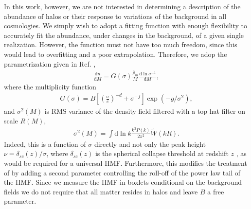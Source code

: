 In this work, however, we are not interested in determining a description of the abundance of halos or their response to variations of the background in all cosmologies. We simply wish to adopt a fitting function with enough flexibility to accurately fit the abundance, under changes in the background, of a given single realization. However, the function must not have too much freedom, since this would lead to overfitting and a poor extrapolation. Therefore, we adop the parametrization given in Ref. \citep{aemulushmf},
\begin{align}
\frac{\mathrm{d}n}{\mathrm{d}M} = G(\sigma)\frac{\overline{\rho}_m}{M}\frac{\mathrm{d}\ln{\sigma^{-1}}}{\mathrm{d}M},
\end{align}
where the multiplicity function
\begin{align}
G(\sigma) = B \left[ \left( \frac{\sigma}{e}\right)^{-d} + \sigma^{-f} \right] \exp{\left( -g / \sigma^2 \right)},
\end{align}
and $\sigma^2(M)$ is RMS variance of the density field filtered with a top hat filter on scale $R(M)$,
\begin{align}
\sigma^2(M) = \int \mathrm{d}\ln{k} \frac{k^3 P(k)}{2\pi^2} \tilde{W}(kR).
\end{align}
Indeed, this is a function of $\sigma$ directly and not only the peak height $\nu = \delta_{sc}(z)/\sigma$, where $\delta_{sc}(z)$ is the spherical collapse threshold at redshift $z$ \citep{halomodelreview}, as would be required for a universal HMF. Furthermore, this modifies the treatment of \citep{tinker2008} by adding a second parameter controlling the roll-off of the power law tail of the HMF. Since we measure the HMF in boxlets conditional on the background fields we do not require that all matter resides in halos and leave $B$ a free parameter.

